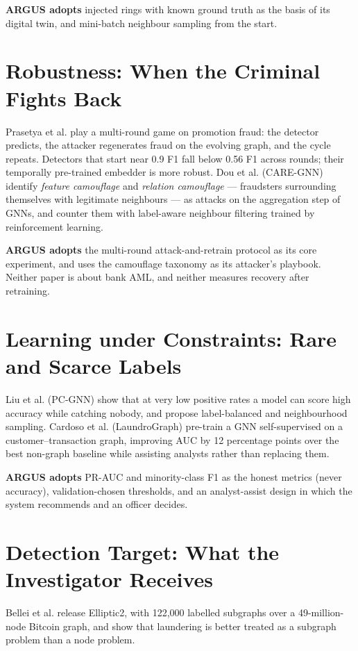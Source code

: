 \textbf{ARGUS adopts} injected rings with known ground truth as the basis of its digital twin, and mini-batch neighbour sampling from the start.

\section{Robustness: When the Criminal Fights Back}
Prasetya et al. \cite{prasetya2025multi} play a multi-round game on promotion fraud: the detector predicts, the attacker regenerates fraud on the evolving graph, and the cycle repeats. Detectors that start near 0.9 F1 fall below 0.56 F1 across rounds; their temporally pre-trained embedder is more robust. Dou et al. \cite{dou2020enhancing} (CARE-GNN) identify \emph{feature camouflage} and \emph{relation camouflage} --- fraudsters surrounding themselves with legitimate neighbours --- as attacks on the aggregation step of GNNs, and counter them with label-aware neighbour filtering trained by reinforcement learning.

\textbf{ARGUS adopts} the multi-round attack-and-retrain protocol as its core experiment, and uses the camouflage taxonomy as its attacker's playbook. Neither paper is about bank AML, and neither measures recovery after retraining.

\section{Learning under Constraints: Rare and Scarce Labels}
Liu et al. \cite{liu2021pick} (PC-GNN) show that at very low positive rates a model can score high accuracy while catching nobody, and propose label-balanced and neighbourhood sampling. Cardoso et al. \cite{cardoso2022laundrograph} (LaundroGraph) pre-train a GNN self-supervised on a customer--transaction graph, improving AUC by 12 percentage points over the best non-graph baseline while assisting analysts rather than replacing them.

\textbf{ARGUS adopts} PR-AUC and minority-class F1 as the honest metrics (never accuracy), validation-chosen thresholds, and an analyst-assist design in which the system recommends and an officer decides.

\section{Detection Target: What the Investigator Receives}
Bellei et al. \cite{bellei2024shape} release Elliptic2, with 122{,}000 labelled subgraphs over a 49-million-node Bitcoin graph, and show that laundering is better treated as a subgraph problem than a node problem.

